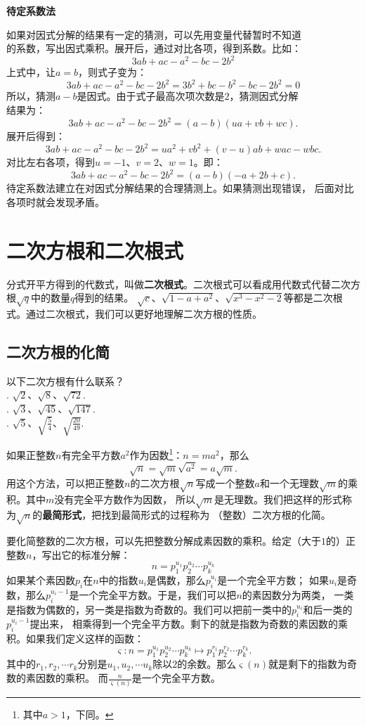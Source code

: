 \documentclass[12pt,UTF8]{ctexbook}
\begin{document}
\noindent \textbf{待定系数法}

\indent 如果对因式分解的结果有一定的猜测，可以先用变量代替暂时不知道\\
\indent 的系数，写出因式乘积。展开后，通过对比各项，得到系数。比如：
$$ 3ab + ac - a^2- bc -2b^2 $$
\indent 上式中，让$a = b$，则式子变为：
$$ 3ab + ac - a^2- bc -2b^2 = 3b^2 + bc - b^2- bc -2b^2 = 0$$
\indent 所以，猜测$a - b$是因式。由于式子最高次项次数是$2$，猜测因式分解\\
\indent 结果为：
$$ 3ab + ac - a^2- bc -2b^2 = (a - b)(ua + vb + wc).$$
\indent 展开后得到：
$$ 3ab + ac - a^2- bc -2b^2 = ua^2 + vb^2 + (v - u)ab + wac - wbc. $$
\indent 对比左右各项，得到$u = -1$、$v = 2$、$w = 1$。即：
$$ 3ab + ac - a^2- bc -2b^2 = (a - b)(-a + 2b + c).$$
\indent 待定系数法建立在对因式分解结果的合理猜测上。如果猜测出现错误，
\indent 后面对比各项时就会发现矛盾。


\chapter{二次方根和二次根式}
分式开平方得到的代数式，叫做\textbf{二次根式}。二次根式可以看成用代数式代替二次方根$\sqrt{q}$中的数量$q$得到的结果。
$\sqrt{c}$、$\sqrt{1 - a + a^2}$、$\sqrt{x^3 - x^2 - 2}$等都是二次根式。通过二次根式，我们可以更好地理解二次方根的性质。
\section{二次方根的化简}
\begin{sk}\label{sk:3-0-0}
    以下二次方根有什么联系？\\
    . $\sqrt{2}$、$\sqrt{8}$、$\sqrt{72}$.\\
    . $\sqrt{3}$、$\sqrt{45}$、$\sqrt{147}$.\\
    . $\sqrt{5}$、$\sqrt{\frac{5}{4}}$、$\sqrt{\frac{20}{49}}$.
\end{sk}
如果正整数$n$有完全平方数$a^2$作为因数\footnote{其中$a>1$，下同。}：$n = ma^2$，那么
$$\sqrt{n} = \sqrt{m}\sqrt{a^2} = a\sqrt{m}.$$
用这个方法，可以把正整数$n$的二次方根$\sqrt{n}$写成一个整数$a$和一个无理数$\sqrt{m}$的乘积。其中$m$没有完全平方数作为因数，
所以$\sqrt{m}$是无理数。我们把这样的形式称为$\sqrt{n}$的\textbf{最简形式}，把找到最简形式的过程称为
（整数）二次方根的化简。

要化简整数的二次方根，可以先把整数分解成素因数的乘积。给定（大于$1$的）正整数$n$，写出它的标准分解：
$$n = p_1^{u_1} p_2^{u_2} \cdots p_k^{u_k}$$
如果某个素因数$p_i$在$n$中的指数$u_i$是偶数，那么$p_i^{u_i}$是一个完全平方数；
如果$u_i$是奇数，那么$p_i^{u_i-1}$是一个完全平方数。于是，我们可以把$n$的素因数分为两类，
一类是指数为偶数的，另一类是指数为奇数的。我们可以把前一类中的$p_i^{u_i}$和后一类的$p_i^{u_i-1}$提出来，
相乘得到一个完全平方数。剩下的就是指数为奇数的素因数的乘积。如果我们定义这样的函数：
$$ \varsigma: n = p_1^{u_1} p_2^{u_2} \cdots p_k^{u_k} \mapsto p_1^{r_1} p_2^{r_2} \cdots p_k^{r_k}. $$
其中的$r_1, r_2, \cdots r_k$分别是$u_1, u_2, \cdots u_k$除以$2$的余数。那么$\varsigma(n)$就是剩下的指数为奇数的素因数的乘积。
而$\frac{n}{\varsigma(n)}$是一个完全平方数。
\end{document}
